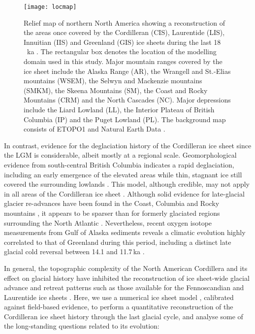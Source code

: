 \documentclass[tc]{copernicus}
\begin{document}
\begin{figure}
  \texttt{[image: locmap]}
  \caption{Relief map of northern North America showing a reconstruction of the
           areas once covered by the Cordilleran (CIS), Laurentide (LIS),
           Innuitian (IIS) and Greenland (GIS) ice sheets during the last
           18\,\unit{\,ka} \citep[21.4\,cal\,ka,][]{Dyke.2004}.
           The rectangular box denotes the location of the
           modelling domain used in this study. Major mountain ranges covered
           by the ice sheet include the Alaska Range (AR), the Wrangell and
           St.-Elias mountains (WSEM), the Selwyn and Mackenzie mountains
           (SMKM), the Skeena Mountains (SM), the Coast and Rocky
           Mountains (CRM) and the North Cascades (NC). Major depressions
           include the Liard Lowland (LL), the Interior Plateau of British
           Columbia (IP) and the Puget Lowland (PL). The background
           map consists of ETOPO1 \citep{Amante.Eakins.2009} and Natural Earth
           Data \citep{Patterson.Kelso.2015}.}
  \label{fig:locmap}
\end{figure}

In contrast, evidence for the deglaciation history of the Cordilleran
ice sheet since the LGM is considerable, albeit mostly at a regional scale.
Geomorphological evidence from south-central British Columbia indicates a rapid
deglaciation, including an early emergence of the elevated areas while thin,
stagnant ice still covered the surrounding lowlands
    \citep{Fulton.1967, Fulton.1991, Margold.etal.2011, Margold.etal.2013a}.
This model, although credible, may not apply in all areas of the Cordilleran
ice sheet
    \citep{Margold.etal.2013}.
Although solid evidence for late-glacial glacier re-advances have been found in
the Coast, Columbia and Rocky mountains
    \citep{Clague.etal.1997, Friele.Clague.2002, Friele.Clague.2002a,
           Kovanen.2002, Kovanen.Easterbrook.2002, Lakeman.etal.2008,
           Menounos.etal.2008},
it appears to be sparser than for formerly glaciated regions surrounding
the North Atlantic
    \citep[e.g.,][]{Sissons.1979, Lundqvist.1987,
                    Ivy-Ochs.etal.1999, Stea.etal.2011}.
Nevertheless, recent oxygen isotope measurements from Gulf of Alaska sediments
reveals a climatic evolution highly correlated to that of Greenland during this
period, including a distinct late glacial cold reversal between 14.1 and
11.7\,ka \citep{Praetorius.Mix.2014}.

In general, the topographic complexity of the North American Cordillera and its
effect on glacial history have inhibited the reconstruction of ice sheet-wide
glacial advance and retreat patterns such as
those available for the Fennoscandian and Laurentide ice sheets
     \citep{Boulton.etal.2001, Dyke.Prest.1987, Dyke.etal.2003,
            Kleman.etal.1997, Kleman.etal.2010, Stroeven.etal.inreview}.
Here, we use a numerical ice sheet model \citep{PISM-authors.2015},
calibrated against field-based evidence, to perform a quantitative
reconstruction of the Cordilleran ice sheet history through the last glacial
cycle, and
analyse some of the long-standing questions related to its evolution:
\end{document}
